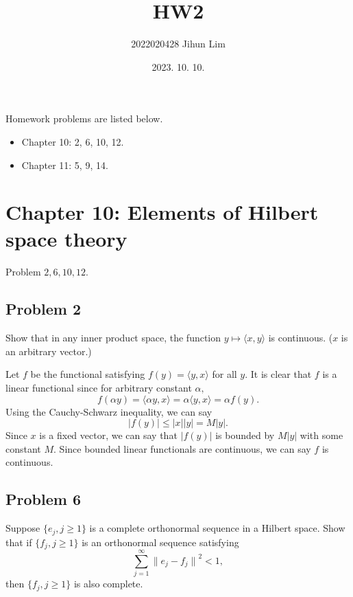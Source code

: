 \documentclass{article}
\title{HW2}
\author{ 2022020428 Jihun Lim}
\date{2023. 10. 10. }
\theoremstyle{definition}
\numberwithin{equation}{section}
\begin{document}
\maketitle

Homework problems are listed below.
\begin{itemize}
\item  Chapter 10: 2, 6, 10, 12.
\item  Chapter 11: 5, 9, 14. 
\end{itemize}


\section{Chapter 10: Elements of Hilbert space theory}

Problem $2, 6, 10, 12$.


\subsection{Problem 2}

\begin{problem}
Show that in any inner product space, the function $y \mapsto \langle x,y \rangle$ is
continuous. ($x$ is an arbitrary vector.)

\end{problem}

\begin{mysol}
Let $f$ be the functional satisfying $f(y) = \langle y,x \rangle$ for all $y$.
It is clear that $f$ is a linear functional since for arbitrary constant $\alpha,$ $$ f(\alpha y) = \langle \alpha y,x \rangle = \alpha \langle y,x \rangle = \alpha f(y).$$
Using the Cauchy-Schwarz inequality, we can say $$\vert f(y) \vert \leq \vert x \vert \vert y \vert = M\vert y \vert.$$
Since $x$ is a fixed vector, we can say that $\vert f(y) \vert$ is bounded by $M\vert y \vert$ with some constant $M$. 
Since bounded linear functionals are continuous, we can say $f$ is continuous.
\end{mysol}

\subsection{Problem 6}

\begin{problem}
Suppose $\{e_{j}, j \geq 1\}$ is a complete orthonormal sequence in a Hilbert space.
Show that if $\{f_{j}, j \geq 1 \}$ is an orthonormal sequence satisfying $$\sum_{j=1}^{\infty}  {\lVert e_{j} - f_{j}\rVert}^{2} < 1,$$
then $\{f_{j}, j \geq 1 \}$ is also complete.

\end{problem}
\end{document}
